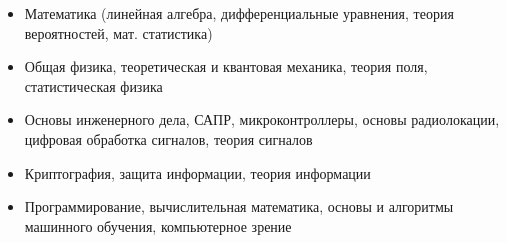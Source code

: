 \documentclass[10pt,a4paper]{cv}
\begin{document}
\begin{itemize}
\item Математика (линейная алгебра, дифференциальные уравнения, теория вероятностей, мат. статистика)
\item Общая физика, теоретическая и квантовая механика, теория поля, статистическая физика
\item Основы инженерного дела, САПР, микроконтроллеры, основы радиолокации, цифровая обработка сигналов, теория сигналов
\item Криптография, защита информации, теория информации
\item Программирование, вычислительная математика, основы и алгоритмы машинного обучения, компьютерное зрение
\end{itemize}




 

\clearpage
\end{document}
